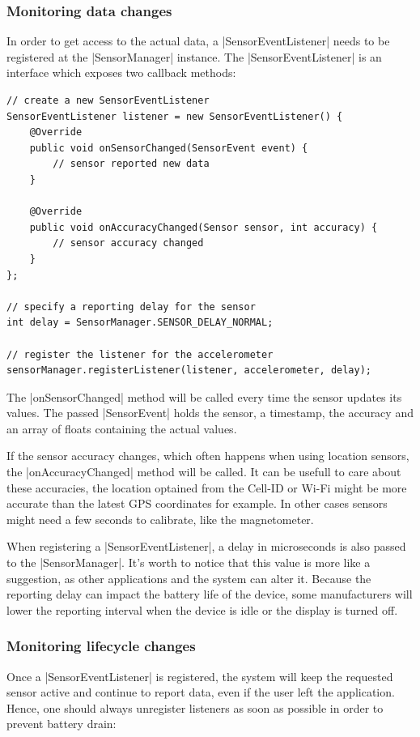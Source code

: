 \subsubsection{Monitoring data changes}
\label{sec:implementation:monitoringdatachanges}
In order to get access to the actual data, a |SensorEventListener|\cite{androiddocs:sensoreventlistener} needs to be registered at the |SensorManager| instance. The |SensorEventListener| is an interface which exposes two callback methods:

\begin{lstlisting}[label=registersensoreventlistener]
// create a new SensorEventListener
SensorEventListener listener = new SensorEventListener() {
	@Override
	public void onSensorChanged(SensorEvent event) {
		// sensor reported new data
	}

	@Override
	public void onAccuracyChanged(Sensor sensor, int accuracy) {
		// sensor accuracy changed
	}
};

// specify a reporting delay for the sensor
int delay = SensorManager.SENSOR_DELAY_NORMAL;

// register the listener for the accelerometer
sensorManager.registerListener(listener, accelerometer, delay);
\end{lstlisting}

The |onSensorChanged| method will be called every time the sensor updates its values. The passed |SensorEvent|\cite{androiddocs:sensorevent} holds the sensor, a timestamp, the accuracy and an array of floats containing the actual values.

If the sensor accuracy changes, which often happens when using location sensors, the |onAccuracyChanged| method will be called.
It can be usefull to care about these accuracies, the location optained from the Cell-ID or Wi-Fi might be more accurate than the latest GPS coordinates for example.
In other cases sensors might need a few seconds to calibrate, like the magnetometer.

When registering a |SensorEventListener|, a delay in microseconds is also passed to the |SensorManager|.
It's worth to notice that this value is more like a suggestion, as other applications and the system can alter it.
Because the reporting delay can impact the battery life of the device, some manufacturers will lower the reporting interval when the device is idle or the display is turned off.

\clearpage

\subsubsection{Monitoring lifecycle changes}
\label{sec:implementation:monitoringlifecyclechanges}
Once a |SensorEventListener| is registered, the system will keep the requested sensor active and continue to report data, even if the user left the application.
Hence, one should always unregister listeners as soon as possible in order to prevent battery drain:

